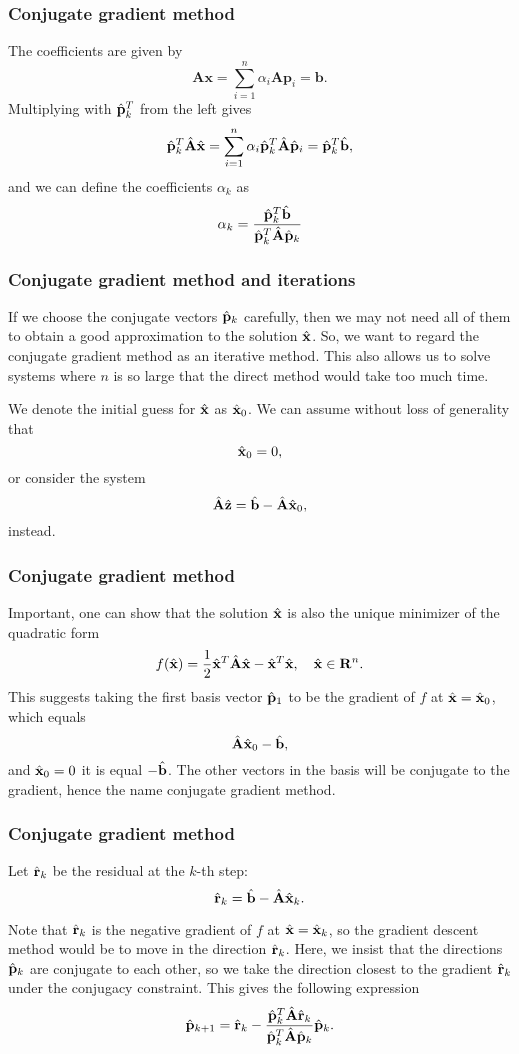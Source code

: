 \frame
{
  \frametitle{Conjugate gradient method}
\begin{small}
{\scriptsize
The coefficients are given by
\[
    \mathbf{A}\mathbf{x} = \sum^{n}_{i=1} \alpha_i \mathbf{A} \mathbf{p}_i = \mathbf{b}.
\]
Multiplying with $\hat{\bf {p}}_k^T$  from the left gives
\[
  \hat{\bf {p}}_k^T \hat{\bf {A}}\hat{\bf {x}} = \sum^{n}_{i=1} \alpha_i\hat{\bf {p}}_k^T \hat{\bf {A}}\hat{\bf {p}}_i= \hat{\bf {p}}_k^T \hat{\bf {b}},
\]
and we can define the coefficients $\alpha_k$ as 
\[
    \alpha_k = \frac{\hat{\bf {p}}_k^T \hat{\bf {b}}}{\hat{\bf {p}}_k^T \hat{\bf {A}} \hat{\bf {p}}_k}
\] 
}
\end{small}
}

\frame
{
  \frametitle{Conjugate gradient method and iterations}
\begin{small}
{\scriptsize
If we choose the conjugate vectors $\hat{\bf {p}}_k$ carefully, 
then we may not need all of them to obtain a good approximation to the solution 
$\hat{\bf {x}}$. 
So, we want to regard the conjugate gradient method as an iterative method. 
This also allows us to solve systems where $n$ is so large that the direct 
method would take too much time.

We denote the initial guess for $\hat{\bf {x}}$ as $\hat{\bf {x}}_0$. 
We can assume without loss of generality that 
\[
\hat{\bf {x}}_0=0,
\]
or consider the system 
\[
\hat{\bf {A}}\hat{\bf {z}} = \hat{\bf {b}}-\hat{\bf {A}}\hat{\bf {x}}_0,
\]
instead.
}
\end{small}
}


\frame
{
  \frametitle{Conjugate gradient method}
\begin{small}
{\scriptsize
Important, one can show that the solution $\hat{\bf {x}}$ is also the unique minimizer of the quadratic form
\[
  f(\hat{\bf {x}}) = \frac{1}{2}\hat{\bf {x}}^T\hat{\bf {A}}\hat{\bf {x}} - \hat{\bf {x}}^T \hat{\bf {x}} , \quad \hat{\bf {x}}\in\mathbf{R}^n. 
\]
This suggests taking the first basis vector $\hat{\bf {p}}_1$ 
to be the gradient of $f$ at $\hat{\bf {x}}=\hat{\bf {x}}_0$, 
which equals 
\[
\hat{\bf {A}}\hat{\bf {x}}_0-\hat{\bf {b}},
\]
and 
$\hat{\bf {x}}_0=0$ it is equal $-\hat{\bf {b}}$.
The other vectors in the basis will be conjugate to the gradient, 
hence the name conjugate gradient method.
}
\end{small}
}


\frame
{
  \frametitle{Conjugate gradient method}
\begin{small}
{\scriptsize
Let  $\hat{\bf {r}}_k$ be the residual at the $k$-th step:
\[
\hat{\bf {r}}_k=\hat{\bf {b}}-\hat{\bf {A}}\hat{\bf {x}}_k.
\]

Note that $\hat{\bf {r}}_k$ is the negative gradient of $f$ at 
$\hat{\bf {x}}=\hat{\bf {x}}_k$, 
so the gradient descent method would be to move in the direction $\hat{\bf {r}}_k$. 
Here, we insist that the directions $\hat{\bf {p}}_k$ are conjugate to each other, 
so we take the direction closest to the gradient $\hat{\bf {r}}_k$  
under the conjugacy constraint. 
This gives the following expression
\[
\hat{\bf {p}}_{k+1}=\hat{\bf {r}}_k-\frac{\hat{\bf {p}}_k^T \hat{\bf {A}}\hat{\bf {r}}_k}{\hat{\bf {p}}_k^T\hat{\bf {A}}\hat{\bf {p}}_k} \hat{\bf {p}}_k.
\]
}
\end{small}
}

